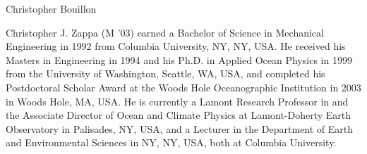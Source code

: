 \documentclass[letterpaper,journal]{IEEEtran}
\begin{document}
\begin{IEEEbiography}{Christopher Bouillon}
\end{IEEEbiography}

\begin{IEEEbiography}{Christopher J. Zappa}
(M '03) earned a Bachelor of Science in Mechanical Engineering in 1992 from Columbia University, NY, NY, USA.  He received his Masters in Engineering in 1994 and his Ph.D. in Applied Ocean Physics in 1999 from the University of Washington, Seattle, WA, USA, and completed his Postdoctoral Scholar Award at the Woods Hole Oceanographic Institution in 2003 in Woods Hole, MA, USA. He is currently a Lamont Research Professor in and the Associate Director of Ocean and Climate Physics at Lamont-Doherty Earth Observatory in Palisades, NY, USA, and a Lecturer in the Department of Earth and Environmental Sciences in NY, NY, USA, both at Columbia University.
\end{IEEEbiography}
\end{document}

